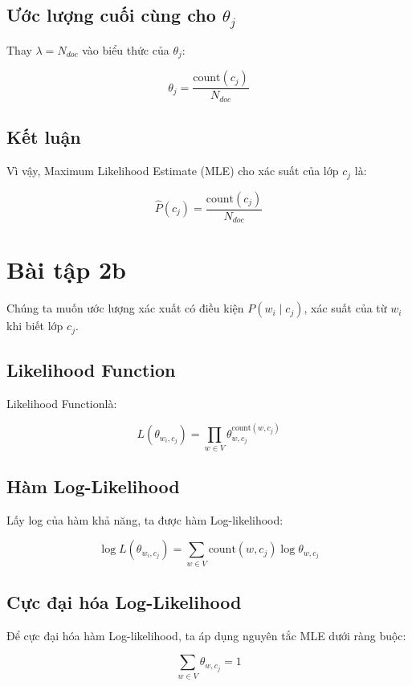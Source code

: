 \documentclass[a4paper, 15pt]{article}
\begin{document}
\subsection*{Ước lượng cuối cùng cho \( \theta_j \)}

Thay \( \lambda = N_{doc} \) vào biểu thức của \( \theta_j \):

\[
    \theta_j = \frac{\text{count}(c_j)}{N_{doc}}
\]

\subsection*{Kết luận}

Vì vậy, Maximum Likelihood Estimate (MLE) cho xác suất của lớp \( c_j \) là:

\[
    \hat{P}(c_j) = \frac{\text{count}(c_j)}{N_{doc}}
\]

\section*{Bài tập 2b}

Chúng ta muốn ước lượng xác xuất có điều kiện \( P(w_i \mid c_j) \), xác suất của từ \( w_i \) khi biết lớp \( c_j \).

\subsection*{Likelihood Function}

Likelihood Functionlà:

\[
    L(\theta_{w_i, c_j}) = \prod_{w \in V} \theta_{w, c_j}^{\text{count}(w, c_j)}
\]

\subsection*{Hàm Log-Likelihood}

Lấy log của hàm khả năng, ta được hàm Log-likelihood:

\[
    \log L(\theta_{w_i, c_j}) = \sum_{w \in V} \text{count}(w, c_j) \log \theta_{w, c_j}
\]

\subsection*{Cực đại hóa Log-Likelihood}

Để cực đại hóa hàm Log-likelihood, ta áp dụng nguyên tắc MLE dưới ràng buộc:

\[
    \sum_{w \in V} \theta_{w, c_j} = 1
\]
\end{document}
